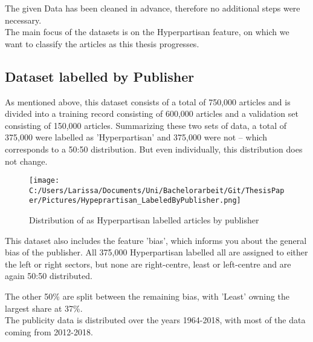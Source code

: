 \documentclass[11pt,titlepage,oneside,openany]{book}
\begin{document}
 \noindent The given Data has been cleaned in advance, therefore no additional steps were necessary.\\ 
 The main focus of the datasets is on the Hyperpartisan feature, on which we want to classify the articles as this thesis progresses.
 

\subsection{Dataset labelled by Publisher}
As mentioned above, this dataset consists of a total of 750,000 articles and is divided into a training record consisting of 600,000 articles and a validation set consisting of 150,000 articles. Summarizing these two sets of data, a total of 375,000 were labelled as 'Hyperpartisan' and 375,000 were not – which corresponds to a 50:50 distribution. But even individually, this distribution does not change. 
\begin{figure}[h]
	\centering
	\texttt{[image: C:/Users/Larissa/Documents/Uni/Bachelorarbeit/Git/ThesisPaper/Pictures/Hypeprartisan\_LabeledByPublisher.png]}
	\caption{Distribution of as Hyperpartisan labelled articles by publisher}
	\label{fig:example}
\end{figure}

\noindent This dataset also includes the feature 'bias', which informs you about the general bias of the publisher. All 375,000 Hyperpartisan labelled all are assigned to either the left or right sectors, but none are right-centre, least or left-centre and are again 50:50 distributed.


\noindent The other 50\% are split between the remaining bias, with 'Least' owning the largest share at 37\%.\\
The publicity data is distributed over the years 1964-2018, with most of the data coming from 2012-2018.
\begin{figure}[h]
\end{figure}
\end{document}
